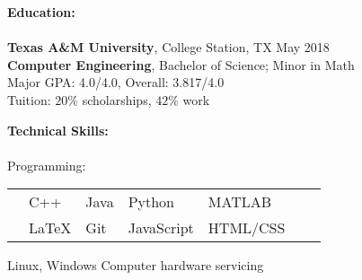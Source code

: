 \documentclass[12pt]{article}
\begin{document}
\begin{flushleft}
\begin{outline}[compactitem]

\newlength{\upspacelength}
\setlength{\upspacelength}{0px}
\newcommand{\upspace}{\vspace{\upspacelength}}
\newcommand{\zzz}[1]{\upspace \0 \textbf{#1} \\ \vspace{-0.8\baselineskip} \hrulefill \vspace{-2px} \\ }
\let\oldOne\1\let\oldTwo\2\let\oldThree\3\let\oldFour\4
\renewcommand{\1}{\upspace \oldOne  }
\renewcommand{\2}{\upspace \oldTwo  }
\renewcommand{\3}{\upspace \oldThree}
\renewcommand{\4}{\upspace \oldFour }

\zzz{Education:}
  \1 \textbf{Texas A\&M University}, College Station, TX \hfill May 2018
  \\ \textbf{Computer Engineering}, Bachelor of Science; Minor in Math
  \\ Major GPA: 4.0/4.0, Overall: 3.817/4.0
  \\ Tuition: $20\%$ scholarships, $42\%$ work

\zzz{Technical Skills:}
  \1 Programming:
    \\
    \vspace{-\baselineskip}\vspace{-\upspacelength}
    \begin{tabularx}{\textwidth}{X X X X X X X}
      & C++   & Java & Python     & MATLAB   \upspace \\
      & LaTeX & Git  & JavaScript & HTML/CSS \upspace \\
    \end{tabularx}
    \vspace{-5px}\upspace
  \1 
    Linux, Windows
    \hfill{}\hspace{1px}
    Computer hardware servicing
    \hfill\hfill


\end{outline}
\end{flushleft}
\end{document}
